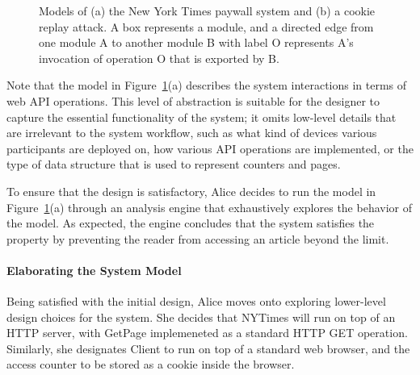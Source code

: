 \begin{figure}[!t]
  \centering {}
  \hfil {}
\caption{Models of (a) the New York Times paywall system and (b)
  a cookie replay attack. A box represents a module, and a
  directed edge from one module \textsf{A} to another module
  \textsf{B} with label \textsf{O} represents \textsf{A}'s invocation
  of operation \textsf{O} that is exported by \textsf{B}.}
\label{fig-nytimes}
\end{figure}

Note that the model in Figure~\ref{fig-nytimes}(a) describes the system
interactions in terms of web API operations. This level of abstraction
is suitable for the designer to capture the essential functionality of
the system; it omits low-level details that are irrelevant to the
system workflow, such as what kind of devices various participants
are deployed on, how various API operations are implemented, or the
type of data structure that is used to represent counters and pages.

To ensure that the design is satisfactory, Alice decides to run the
model in Figure~\ref{fig-nytimes}(a) through an analysis engine that
exhaustively explores the behavior of the model. As expected, the
engine concludes that the system satisfies the property by preventing
the reader from accessing an article beyond the limit.

\paragraph{\textbf{Elaborating the System Model}} Being satisfied with the
initial design, Alice moves onto exploring lower-level design
choices for the system. She decides that \textsf{NYTimes} will run on
top of an HTTP server, with \textsf{GetPage} implemeneted as a
standard HTTP GET operation. Similarly, she
designates \textsf{Client} to run on top of a standard web browser,
and the access counter to be stored as a cookie inside the browser.

